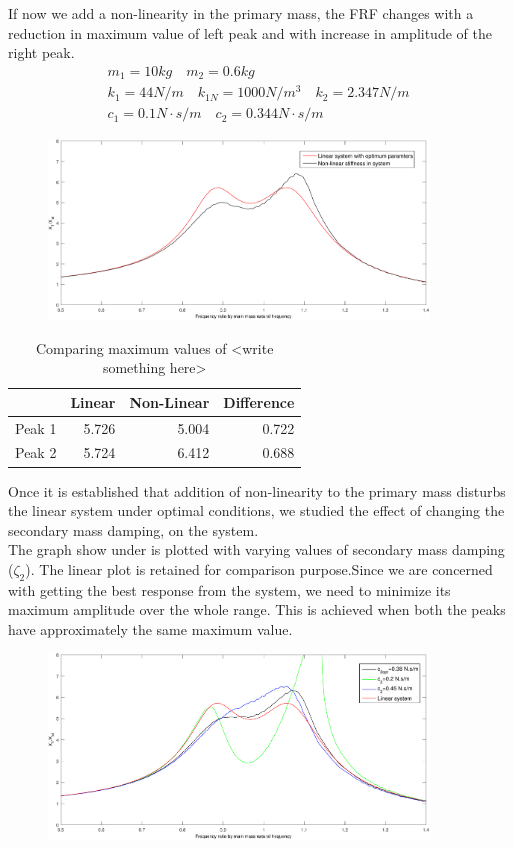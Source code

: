 If now we add a non-linearity in the primary mass,
the FRF changes with a reduction in maximum value of left peak and with increase in amplitude of the right peak.
\begin{align*}
&m_1 = 10kg\quad m_2 = 0.6kg\quad \\
&k_1=44 N/m\quad
k_{1N} = 1000 N/m^3\quad k_2 = 2.347 N/m \quad \\
&c_1 = 0.1 N\cdot s/m \quad
c_2 = 0.344 N\cdot s/m 
\end{align*}
\begin{figure}[h!]
\includegraphics[width=0.9\textwidth]{"figures/nonlinear"}
\end{figure}
\begin{table}
\centering
\begin{tabular}{|r|r|r|r|}
\hline
 & Linear & Non-Linear & Difference \\ \hline
Peak 1 & 5.726 & 5.004 & 0.722\\
Peak 2 & 5.724  & 6.412 & 0.688\\ \hline
\end{tabular}
\caption{Comparing maximum values of <write something here> }
\end{table}
Once it is established that addition of non-linearity to the primary mass disturbs the linear system under optimal conditions, we studied the effect of changing the secondary mass damping, on the system.\\
The graph show under is plotted with varying values of secondary mass damping ($\zeta_2$). The linear plot is retained for comparison purpose.Since we are concerned with getting the best response from the system, we need to minimize its maximum amplitude over the whole range. This is achieved when both the peaks have approximately the same maximum value.\\[0.2in]
\begin{figure}[h!]
\includegraphics[width=0.9\textwidth]{"figures/change"}\\[0.2in] 
\end{figure}
